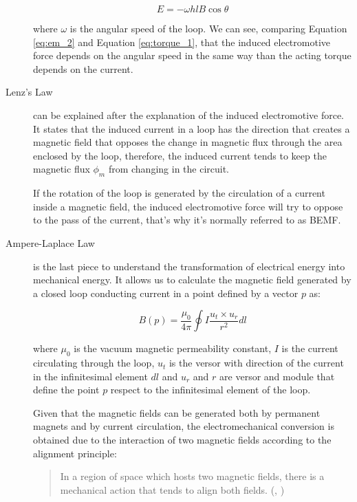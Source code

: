 \begin{description}
\begin{equation}
	\label{eq:em_2}
	E = - \omega h l B \cos \theta
\end{equation}

where $\omega$ is the angular speed of the loop. We can see, comparing Equation \ref{eq:em_2} and Equation \ref{eq:torque_1}, that the induced electromotive force depends on the angular speed in the same way than the acting torque depends on the current.

\item[Lenz's Law] can be explained after the explanation of the induced electromotive force. It states that the induced current in a loop has the direction that creates a magnetic field that opposes the change in magnetic flux through the area enclosed by the loop, therefore, the induced current tends to keep the magnetic flux $\phi _{m}$ from changing in the circuit.

If the rotation of the loop is generated by the circulation of a current inside a magnetic field, the induced electromotive force will try to oppose to the pass of the current, that’s why it’s normally referred to as \acf{BEMF}.

\item[Ampere-Laplace Law] is the last piece to understand the transformation of electrical energy into mechanical energy. It allows us to calculate the magnetic field generated by a closed loop conducting current in a point defined by a vector $p$ as:

\begin{equation}
	\label{eq:B_1}
	B(p) = \frac{\mu_{0}}{4 \pi} \oint I \frac{u_{t} \times u_{r}}{r^{2}}dl
\end{equation}

where $\mu_{0}$ is the vacuum magnetic permeability constant, $I$ is the current circulating through the loop, $u_{t}$ is the versor with direction of the current in the infinitesimal element $dl$ and $u_{r}$ and $r$ are versor and module that define the point $p$ respect to the infinitesimal element of the loop.

Given that the magnetic fields can be generated both by permanent magnets and by current circulation, the electromechanical conversion is obtained due to the interaction of two magnetic fields according to the alignment principle:

\blockquote{In a region of space which hosts two magnetic fields, there is a mechanical action that tends to align both fields. (\citeauthor{sistemi_di_controllo:2007}, \citeyear{sistemi_di_controllo:2007})}


\end{description}
